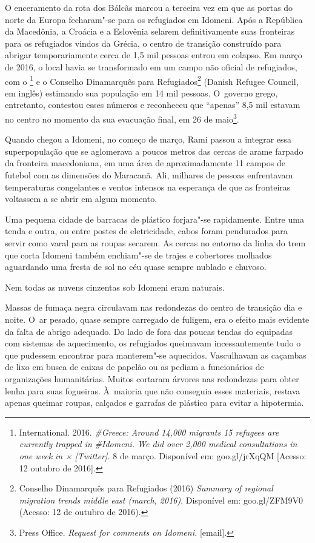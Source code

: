 O enceramento da rota dos Bálcãs marcou a terceira vez em que as portas do
norte da Europa fecharam"-se para os refugiados em Idomeni. Após a
República da Macedônia, a Croácia e a Eslovênia selarem definitivamente suas
fronteiras para os refugiados vindos da Grécia, o centro de transição
construído para abrigar temporariamente cerca de 1,5 mil pessoas
entrou em colapso. Em março de 2016, o local havia se transformado em um campo
não oficial de refugiados, com o \footnote{  International. 2016.
\emph{{\#Greece}}\emph{:
Around 14,000 migrants 15 refugees are currently trapped in}
\emph{{\#Idomeni}}\emph{.
We did over 2,000 medical consultations in one week} \emph{in
×}\emph{ {[}Twitter{]}.} 8 de março. Disponível em:
{goo.gl/jrXqQM}
{[}Acesso: 12 outubro de 2016{]}.}  e o
Conselho Dinamarquês para Refugiados\footnote{ Conselho Dinamarquês para Refugiados (2016)
\emph{Summary of regional migration trends middle east (march, 2016)}.
Disponível em:
goo.gl/ZFM9V0
(Acesso: 12 de outubro de 2016).}  (Danish
Refugee Council, em inglês) estimando sua população em 14 mil pessoas. O~governo grego, entretanto, contestou esses números e reconheceu que
``apenas'' 8,5 mil estavam no centro no momento da sua evacuação final,
em 26 de maio\footnote{ Press Office. \emph{Request for comments on
Idomeni}\emph{.} {[}email{]}.}.

Quando chegou a Idomeni, no começo de março, Rami passou a integrar essa
superpopulação que se aglomerava a poucos metros das cercas de arame
farpado da fronteira macedoniana, em uma área de aproximadamente 11
campos de futebol com as dimensões do Maracanã. Ali, milhares de pessoas
enfrentavam temperaturas congelantes e ventos intensos na esperança de
que as fronteiras voltassem a se abrir em algum momento.

Uma pequena cidade de barracas de plástico forjara"-se rapidamente. Entre
uma tenda e outra, ou entre postes de eletricidade, cabos foram
pendurados para servir como varal para as roupas secarem. As cercas no
entorno da linha do trem que corta Idomeni também enchiam"-se de trajes e
cobertores molhados aguardando uma fresta de sol no céu quase sempre
nublado e chuvoso.

Nem todas as nuvens cinzentas sob Idomeni eram naturais.

Massas de fumaça negra circulavam nas redondezas do centro de transição
dia e noite. O~ar pesado, quase sempre carregado de fuligem, era o
efeito mais evidente da falta de abrigo adequado. Do lado de fora das
poucas tendas do  equipadas com sistemas de aquecimento, os
refugiados queimavam incessantemente tudo o que pudessem encontrar para
manterem"-se aquecidos. Vasculhavam as caçambas de lixo em busca de
caixas de papelão ou as pediam a funcionários de organizações
humanitárias. Muitos cortaram árvores nas redondezas para obter lenha
para suas fogueiras. À~maioria que não conseguia esses materiais,
restava apenas queimar roupas, calçados e garrafas de plástico para
evitar a hipotermia.

